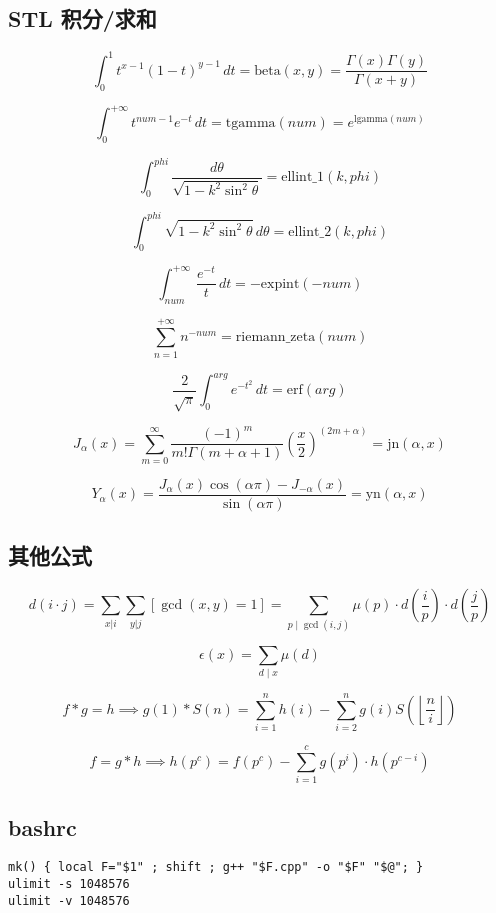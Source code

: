 \documentclass[a4paper,landscape,twocolumn]{ctexart}
\begin{document}
\subsection{STL 积分/求和}

{
\Large
$$ \int_0^1 t^{x-1}(1-t)^{y-1}\,dt = \mathrm{beta}(x,y) = \frac{\Gamma(x)\Gamma(y)}{\Gamma(x+y)} $$

$$ \int_0^{+\infty} t^{num-1}e^{-t}\,dt = \mathrm{tgamma}(num) = e^{\mathrm{lgamma}(num)}$$

$$ \int_0^{phi} \frac{d\theta}{\sqrt{1-k^2\sin^2\theta}} = \mathrm{ellint\_1}(k,phi) $$

$$ \int_0^{phi} \sqrt{1-k^2\sin^2\theta}\,d\theta = \mathrm{ellint\_2}(k,phi) $$

$$ \int_{num}^{+\infty} \frac{e^{-t}}{t}\,dt = -\mathrm{expint}(-num) $$

$$ \sum_{n=1}^{+\infty} n^{-num} = \mathrm{riemann\_zeta}(num) $$

$$ \frac{2}{\sqrt{\pi}}\int_0^{arg} e^{-t^2}\,dt = \mathrm{erf}(arg) $$

$$ J_{\alpha} (x) = \sum_{m = 0}^{\infty} \frac{(-1)^m}{m ! \Gamma (m + \alpha + 1)} \left(\frac{x}{2}\right) ^ {(2 m + \alpha)} = \mathrm{jn} (\alpha, x) $$

$$ Y_{\alpha} (x) = \frac{J_{\alpha} (x) \cos (\alpha \pi) - J_{ - \alpha} (x)}{\sin (\alpha \pi)} = \mathrm{yn} (\alpha, x) $$

}

\subsection{其他公式}

{
\Large
$$ d(i \cdot j) = \sum_{x | i} \sum_{y | j} [\gcd (x, y) = 1] = \sum_{p \mid \gcd (i, j)} \mu (p) \cdot d (\frac{i}{p}) \cdot d (\frac{j}{p}) $$

$$ \epsilon (x) = \sum \limits_{d \mid x} \mu (d) $$
}

$$
f * g = h \implies g(1) * S(n) = \sum_{i = 1}^{n} h(i) - \sum_{i = 2}^{n} g(i) S(\left \lfloor \frac{n}{i} \right \rfloor)
$$

$$
f = g * h \implies h(p ^ c) = f(p ^ c) - \sum_{i = 1}^{c} g(p ^ i) \cdot h(p ^ {c-i})
$$

\subsection{bashrc}

\begin{lstlisting}
mk() { local F="$1" ; shift ; g++ "$F.cpp" -o "$F" "$@"; }
ulimit -s 1048576
ulimit -v 1048576
\end{lstlisting}
\end{document}
